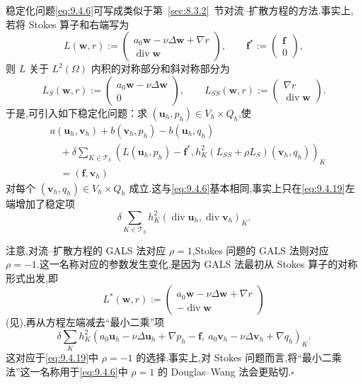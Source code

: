\begin{note}
稳定化问题\eqref{eq:9.4.6}可写成类似于第~\ref{sec:8.3.2}~节对流--扩散方程的方法.事实上,若将 Stokes 算子和右端写为
\begin{equation}\label{eq:9.4.17}
  L(\boldsymbol{w},r):=\begin{pmatrix}a_0\boldsymbol{w}-\nu\Delta\boldsymbol{w}+\nabla r\\
                \operatorname{div}\boldsymbol{w}\end{pmatrix},
   \qquad \boldsymbol{f}^*:=\begin{pmatrix}\boldsymbol{f}\\0\end{pmatrix},
\end{equation}
则 \(L\) 关于 \(L^2(\Omega)\) 内积的对称部分和斜对称部分为
\begin{equation}\label{eq:9.4.18}
  L_S(\boldsymbol{w},r):=\begin{pmatrix}a_0\boldsymbol{w}-\nu\Delta\boldsymbol{w}\\0\end{pmatrix},
   \qquad L_{SS}(\boldsymbol{w},r):=\begin{pmatrix}\nabla r\\\operatorname{div}\boldsymbol{w}\end{pmatrix}.
\end{equation}
于是,可引入如下稳定化问题：求 \((\boldsymbol{u}_h,p_h)\in V_h\times Q_h\),使
\begin{equation}\label{eq:9.4.19}
  \begin{aligned}
    &a(\boldsymbol{u}_h,\boldsymbol{v}_h)+b(\boldsymbol{v}_h,p_h)-b(\boldsymbol{u}_h,q_h)\\
    &\quad+\delta\sum_{K\in\mathcal T_h}
        (L(\boldsymbol{u}_h,p_h)-\boldsymbol{f}^*,h_K^2(L_{SS}+\rho L_S)(\boldsymbol{v}_h,q_h))_K\\
    &\quad=(\boldsymbol{f},\boldsymbol{v}_h)
  \end{aligned}
\end{equation}
对每个 \((\boldsymbol{v}_h,q_h)\in V_h\times Q_h\) 成立.这与\eqref{eq:9.4.6}基本相同,事实上只在\eqref{eq:9.4.19}左端增加了稳定项
\[
  \delta\sum_{K\in\mathcal T_h}h_K^2(\operatorname{div}\boldsymbol{u}_h,\operatorname{div}\boldsymbol{v}_h)_K.
\]

注意,对流--扩散方程的 GALS 法对应 \(\rho=1\),Stokes 问题的 GALS 法则对应 \(\rho=-1\).这一名称对应的参数发生变化,是因为 GALS 法最初从 Stokes 算子的对称形式出发,即
\[
  L^*(\boldsymbol{w},r):=\begin{pmatrix}a_0\boldsymbol{w}-\nu\Delta\boldsymbol{w}+\nabla r\\
                    -\operatorname{div}\boldsymbol{w}\end{pmatrix}
\]
(见),再从方程左端减去“最小二乘”项
\[
  \delta\sum_K h_K^2(a_0\boldsymbol{u}_h-\nu\Delta\boldsymbol{u}_h+\nabla p_h-\boldsymbol{f},\
                    a_0\boldsymbol{v}_h-\nu\Delta\boldsymbol{v}_h+\nabla q_h)_K .
\]
这对应于\eqref{eq:9.4.19}中 \(\rho=-1\) 的选择.事实上,对 Stokes 问题而言,将“最小二乘法”这一名称用于\eqref{eq:9.4.6}中 \(\rho=1\) 的 Douglas--Wang 法会更贴切.\hfill\(\square\)
\end{note}

